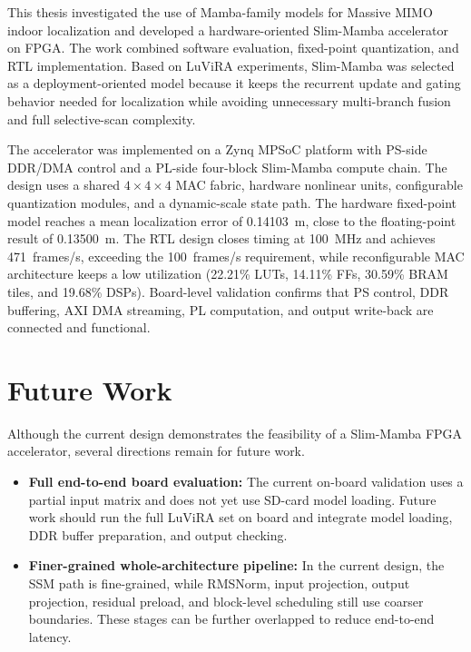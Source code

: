\documentclass[11pt,twoside]{eitExjobb}
\begin{document}
This thesis investigated the use of Mamba-family models for Massive MIMO indoor
localization and developed a hardware-oriented Slim-Mamba accelerator on FPGA. The work
combined software evaluation, fixed-point quantization, and RTL implementation. Based
on LuViRA experiments, Slim-Mamba was selected as a deployment-oriented model because it
keeps the recurrent update and gating behavior needed for localization while avoiding
unnecessary multi-branch fusion and full selective-scan complexity.

The accelerator was implemented on a Zynq MPSoC platform with PS-side DDR/DMA control
and a PL-side four-block Slim-Mamba compute chain. The design uses a shared
\(4\times4\times4\) MAC fabric, hardware nonlinear units, configurable quantization
modules, and a dynamic-scale state path. The hardware fixed-point model reaches a mean
localization error of 0.14103~m, close to the floating-point result of 0.13500~m. The
RTL design closes timing at 100~MHz and achieves 471~frames/s, exceeding the
100~frames/s requirement, while reconfigurable MAC architecture keeps a low utilization
(22.21\% LUTs, 14.11\% FFs, 30.59\% BRAM tiles, and
19.68\% DSPs). Board-level validation confirms that PS control, DDR buffering, AXI DMA
streaming, PL computation, and output write-back are connected and functional.

\section{Future Work}

Although the current design demonstrates the feasibility of a Slim-Mamba FPGA
accelerator, several directions remain for future work.

\begin{itemize}
  \item \textbf{Full end-to-end board evaluation:} The current on-board validation uses a
  partial input matrix and does not yet use SD-card model loading. Future work should run
  the full LuViRA set on board and integrate model loading, DDR buffer preparation, and
  output checking.

  \item \textbf{Finer-grained whole-architecture pipeline:} In the current design, the SSM
  path is fine-grained, while RMSNorm, input projection, output projection, residual
  preload, and block-level scheduling still use coarser boundaries. These stages can be
  further overlapped to reduce end-to-end latency.

\end{itemize}

\clearpage


\end{document}
